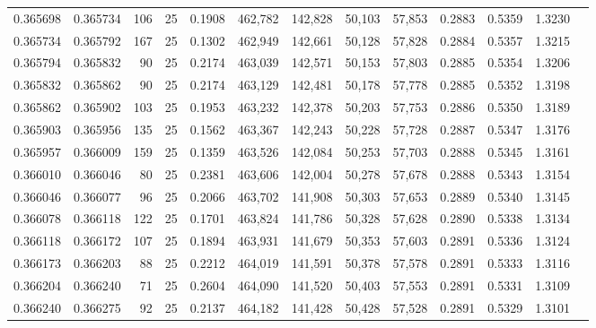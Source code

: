 \begin{tabular}{rrrrrrrrrrrrr}
0.365698 & 0.365734 &   106 &  25 &                                     0.1908 & 462,782 & 142,828 &  50,103 &  57,853 & 0.2883 & 0.5359 & 1.3230 \\
0.365734 & 0.365792 &   167 &  25 &                                     0.1302 & 462,949 & 142,661 &  50,128 &  57,828 & 0.2884 & 0.5357 & 1.3215 \\
0.365794 & 0.365832 &    90 &  25 &                                     0.2174 & 463,039 & 142,571 &  50,153 &  57,803 & 0.2885 & 0.5354 & 1.3206 \\
0.365832 & 0.365862 &    90 &  25 &                                     0.2174 & 463,129 & 142,481 &  50,178 &  57,778 & 0.2885 & 0.5352 & 1.3198 \\
0.365862 & 0.365902 &   103 &  25 &                                     0.1953 & 463,232 & 142,378 &  50,203 &  57,753 & 0.2886 & 0.5350 & 1.3189 \\
0.365903 & 0.365956 &   135 &  25 &                                     0.1562 & 463,367 & 142,243 &  50,228 &  57,728 & 0.2887 & 0.5347 & 1.3176 \\
0.365957 & 0.366009 &   159 &  25 &                                     0.1359 & 463,526 & 142,084 &  50,253 &  57,703 & 0.2888 & 0.5345 & 1.3161 \\
0.366010 & 0.366046 &    80 &  25 &                                     0.2381 & 463,606 & 142,004 &  50,278 &  57,678 & 0.2888 & 0.5343 & 1.3154 \\
0.366046 & 0.366077 &    96 &  25 &                                     0.2066 & 463,702 & 141,908 &  50,303 &  57,653 & 0.2889 & 0.5340 & 1.3145 \\
0.366078 & 0.366118 &   122 &  25 &                                     0.1701 & 463,824 & 141,786 &  50,328 &  57,628 & 0.2890 & 0.5338 & 1.3134 \\
0.366118 & 0.366172 &   107 &  25 &                                     0.1894 & 463,931 & 141,679 &  50,353 &  57,603 & 0.2891 & 0.5336 & 1.3124 \\
0.366173 & 0.366203 &    88 &  25 &                                     0.2212 & 464,019 & 141,591 &  50,378 &  57,578 & 0.2891 & 0.5333 & 1.3116 \\
0.366204 & 0.366240 &    71 &  25 &                                     0.2604 & 464,090 & 141,520 &  50,403 &  57,553 & 0.2891 & 0.5331 & 1.3109 \\
0.366240 & 0.366275 &    92 &  25 &                                     0.2137 & 464,182 & 141,428 &  50,428 &  57,528 & 0.2891 & 0.5329 & 1.3101 \\

\end{tabular}
